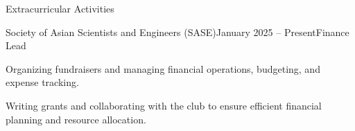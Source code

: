 \documentclass[
	a4paper, %
	9pt, %
]{resume} %
\begin{document}
\begin{rSection}{Extracurricular Activities}
\begin{rSubsection}{Society of Asian Scientists and Engineers (SASE)}{January 2025 -- Present}{Finance Lead}{}
	\item Organizing fundraisers and managing financial operations, budgeting, and expense tracking.
    \item Writing grants and collaborating with the club to ensure efficient financial planning and resource allocation.
    \end{rSubsection}


\end{rSection}






\end{document}
